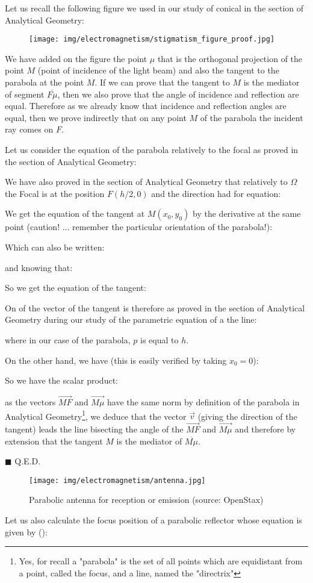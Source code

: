 Let us recall the following figure we used in our study of conical in the section of Analytical Geometry:
	\begin{figure}[H]
		\centering
		\texttt{[image: img/electromagnetism/stigmatism\_figure\_proof.jpg]}
	\end{figure}
	We have added on the figure the point $\mu$ that is the orthogonal projection of the point $M$ (point of incidence of the light beam) and also the tangent to the parabola at the point $M$. If we can prove that the tangent to $M$ is the mediator of segment $\overline{F\mu}$, then we also prove that the angle of incidence and reflection are equal. Therefore as we already know that incidence and reflection angles are equal, then we prove indirectly that on any point $M$ of the parabola the incident ray comes on $F$.
	\begin{dem}
	Let us consider the equation of the parabola relatively to the focal as proved in the section of Analytical Geometry:
	
	We have also proved in the section of Analytical Geometry that relatively to $\Omega$ the Focal is at the position $F(h/2,0)$ and the direction had for equation:
	
	We get the equation of the tangent at $M(x_0,y_0)$ by the derivative at the same point (caution! ... remember the particular orientation of the parabola!):
	
	Which can also be written:
	
	and knowing that:
	
	So we get the equation of the tangent:
	
	On of the vector of the tangent is therefore as proved in the section of Analytical Geometry during our study of the parametric equation of a the line:
	
	where in our case of the parabola, $p$ is equal to $h$.
	
	On the other hand, we have (this is easily verified by taking $x_0=0$):
	
	So we have the scalar product:
	
	as the vectors $\overrightarrow{MF}$ and $\overrightarrow{M\mu}$ have the same norm by definition of the parabola in Analytical Geometry\footnote{Yes, for recall a "parabola" is the set of all points which are equidistant from a point, called the focus, and a line, named the "directrix"}, we deduce that the vector $\vec{v}$ (giving the direction of the tangent) leads the line bisecting the angle of the $\overrightarrow{MF}$ and $\overrightarrow{M\mu}$ and therefore by extension that the tangent $M$ is the mediator of $\overline{M\mu}$.
	\begin{flushright}
		$\blacksquare$  Q.E.D.
	\end{flushright}
	\end{dem} 
	\begin{figure}[H]
		\centering
		\texttt{[image: img/electromagnetism/antenna.jpg]}	
		\caption[Parabolic antenna for reception or emission]{Parabolic antenna for reception or emission (source: OpenStax)}
	\end{figure}
	Let us also calculate the focus position of a parabolic reflector whose equation is given by ():
	
